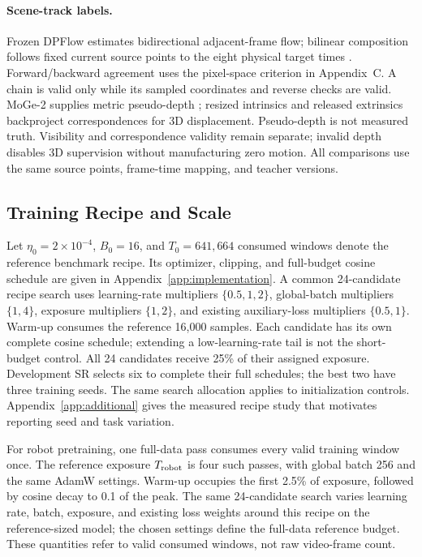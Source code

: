 \paragraph{Scene-track labels.}
Frozen DPFlow estimates bidirectional adjacent-frame flow; bilinear
composition follows fixed current source points to the eight physical
target times \cite{dpflow}. Forward/backward agreement uses the pixel-space
criterion in Appendix~C. A chain is valid only while its sampled coordinates
and reverse checks are valid. MoGe-2 supplies metric pseudo-depth
\cite{moge2}; resized intrinsics and released extrinsics backproject
correspondences for 3D displacement. Pseudo-depth is not measured truth.
Visibility and correspondence validity remain separate; invalid depth
disables 3D supervision without manufacturing zero motion. All comparisons
use the same source points, frame-time mapping, and teacher versions.



\subsection{Training Recipe and Scale}
Let $\eta_0=2\times10^{-4}$, $B_0=16$, and $T_0=641,664$ consumed windows
denote the reference benchmark recipe. Its optimizer, clipping, and
full-budget cosine schedule are given in Appendix~\ref{app:implementation}.
A common 24-candidate recipe search uses learning-rate multipliers
$\{0.5,1,2\}$, global-batch multipliers $\{1,4\}$, exposure multipliers
$\{1,2\}$, and existing auxiliary-loss multipliers $\{0.5,1\}$.
Warm-up consumes the reference 16,000 samples. Each candidate has its own
complete cosine schedule; extending a low-learning-rate tail is not the
short-budget control. All 24 candidates receive 25\% of their assigned
exposure. Development SR selects six to complete their full schedules;
the best two have three training seeds. The same search
allocation applies to initialization controls. Appendix~\ref{app:additional}
gives the measured recipe study that motivates reporting seed and task
variation.

For robot pretraining, one full-data pass consumes every valid training
window once. The reference exposure $T_{\rm robot}$ is four such passes,
with global batch 256 and the same AdamW settings. Warm-up occupies the
first 2.5\% of exposure, followed by cosine decay to 0.1 of the peak.
The same 24-candidate search varies learning rate, batch, exposure, and
existing loss weights around this recipe on the reference-sized model;
the chosen settings define the full-data reference budget. These quantities
refer to valid consumed windows, not raw video-frame count.

